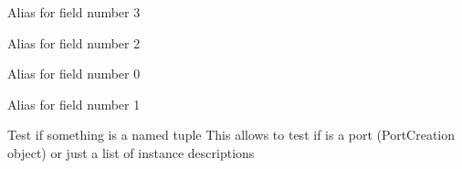 \documentclass[a4paper,10pt,english]{sphinxmanual}
\begin{document}
\begin{fulllineitems}
\begin{quote}
\begin{description}
\begin{itemize}
\end{itemize}

\end{description}\end{quote}

\begin{fulllineitems}
\label{\detokenize{photonics:kppc.photonics.PortCreation.length}}
Alias for field number 3

\end{fulllineitems}


\begin{fulllineitems}
\label{\detokenize{photonics:kppc.photonics.PortCreation.rot}}
Alias for field number 2

\end{fulllineitems}


\begin{fulllineitems}
\label{\detokenize{photonics:kppc.photonics.PortCreation.x}}
Alias for field number 0

\end{fulllineitems}


\begin{fulllineitems}
\label{\detokenize{photonics:kppc.photonics.PortCreation.y}}
Alias for field number 1

\end{fulllineitems}


\end{fulllineitems}


\begin{fulllineitems}
\label{\detokenize{photonics:kppc.photonics.isnamedtupleinstance}}
Test if something is a named tuple
This allows to test if  is a port (PortCreation object) or just a list of instance descriptions

\end{fulllineitems}
\end{document}
